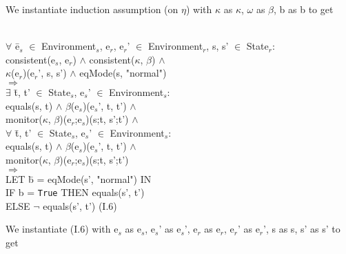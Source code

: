 \documentclass[conference]{IEEEtran}
\begin{document}
\noindent We instantiate induction assumption (on $\eta$) with
$\kappa$ as $\kappa$, $\omega$ as $\beta$, b as b to get
\begin{tabbing}
\\$\forall$ \=e$_s$ $\in$ Environment$_s$, e$_r$, e$_r$' $\in$ Environment$_r$, s, s' $\in$ State$_r$:
\\\>consistent(e$_s$, e$_r$) $\wedge$ consistent($\kappa$, $\beta$) $\wedge$ 
\\\>\textlbrackdbl $\kappa$\textrbrackdbl(e$_r$)(e$_r$', s, s') $\wedge$ eqMode(s, "normal")
\\$\Rightarrow$
\\\>$\exists$ \=t, t' $\in$ State$_s$, e$_s$' $\in$ Environment$_s$: 
\\\>\>equals(s, t) $\wedge$ \textlbrackdbl $\beta$\textrbrackdbl(e$_s$)(e$_s$', t, t') $\wedge$ 
\\\>\>monitor($\kappa$, $\beta$)(e$_r$;e$_s$)(s;t, s';t')
$\wedge$
\\\>$\forall$ \=t, t' $\in$ State$_s$, e$_s$' $\in$ Environment$_s$: 
\\\>\>equals(s, t) $\wedge$ \textlbrackdbl $\beta$\textrbrackdbl(e$_s$)(e$_s$', t, t') $\wedge$ 
\\\>\>monitor($\kappa$, $\beta$)(e$_r$;e$_s$)(s;t, s';t')
\\\>$\Rightarrow$ \=
\\\> LET \=b = eqMode(s', "normal") IN
\\\>\>IF b = \texttt{True} THEN equals(s', t') 
\\\>\> ELSE $\neg$ equals(s', t')   \hspace*{2cm} (I.6)
\end{tabbing}

\noindent We instantiate (I.6) with
e$_s$ as e$_s$, e$_s$' as e$_s$', e$_r$ as e$_r$, e$_r$' as e$_r$', s as s, s' as s' to get
\end{document}
